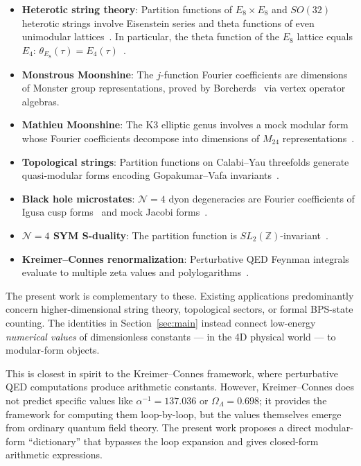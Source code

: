 \documentclass[11pt,a4paper]{article}
\begin{document}
\begin{itemize}
\item \textbf{Heterotic string theory}: Partition functions of
$E_8 \times E_8$ and $SO(32)$ heterotic strings involve Eisenstein
series and theta functions of even unimodular
lattices~\cite{GSW1987}. In particular, the theta function of the
$E_8$ lattice equals $E_4$: $\theta_{E_8}(\tau) = E_4(\tau)$~\cite{Serre1973}.

\item \textbf{Monstrous Moonshine}: The $j$-function Fourier
coefficients are dimensions of Monster group representations, proved
by Borcherds~\cite{Borcherds1992} via vertex operator algebras.

\item \textbf{Mathieu Moonshine}: The K3 elliptic genus involves a
mock modular form whose Fourier coefficients decompose into
dimensions of $M_{24}$ representations~\cite{EOT2010,Gannon2016}.

\item \textbf{Topological strings}: Partition functions on
Calabi--Yau threefolds generate quasi-modular forms encoding
Gopakumar--Vafa invariants~\cite{GV1998,BCOV1994}.

\item \textbf{Black hole microstates}: $\mathcal{N}=4$ dyon degeneracies
are Fourier coefficients of Igusa cusp forms~\cite{DMVV1997} and mock
Jacobi forms~\cite{Dabholkar2012}.

\item \textbf{$\mathcal{N}=4$ SYM S-duality}: The partition function
is $SL_2(\mathbb{Z})$-invariant~\cite{VafaWitten1994}.

\item \textbf{Kreimer--Connes renormalization}: Perturbative QED
Feynman integrals evaluate to multiple zeta values and
polylogarithms~\cite{Kreimer1997,ConnesKreimer2000,Brown2015}.
\end{itemize}

The present work is complementary to these. Existing applications
predominantly concern higher-dimensional string theory, topological
sectors, or formal BPS-state counting. The identities in
Section~\ref{sec:main} instead connect low-energy \emph{numerical
values} of dimensionless constants --- in the 4D physical world ---
to modular-form objects.

This is closest in spirit to the Kreimer--Connes framework, where
perturbative QED computations produce arithmetic constants. However,
Kreimer--Connes does not predict specific values like
$\alpha^{-1} = 137.036$ or $\Omega_\Lambda = 0.698$; it provides the
framework for computing them loop-by-loop, but the values themselves
emerge from ordinary quantum field theory. The present work
proposes a direct modular-form ``dictionary'' that bypasses the
loop expansion and gives closed-form arithmetic expressions.
\end{document}
